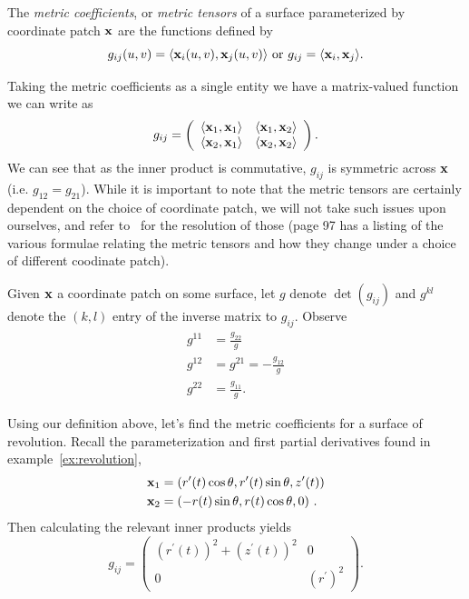   \begin{defn}
    The \emph{metric coefficients}, or \emph{metric tensors} of a surface parameterized by coordinate patch $\mathbf{x}$ are the functions defined by
    \[
      g_{ij}(u, v) = \langle\mathbf{x}_i(u, v), \mathbf{x}_j(u, v)\rangle \text{ or } g_{ij} = \langle\mathbf{x}_i, \mathbf{x}_j\rangle.
    \]

    Taking the metric coefficients as a single entity we have a matrix-valued function we can write as
    \[
      g_{ij} = \left(\begin{array}{cc}
        \langle\mathbf{x}_1, \mathbf{x}_1\rangle & \langle\mathbf{x}_1, \mathbf{x}_2\rangle\\
        \langle\mathbf{x}_2, \mathbf{x}_1\rangle & \langle\mathbf{x}_2, \mathbf{x}_2\rangle
      \end{array}\right).
    \]
    We can see that as the inner product is commutative, $g_{ij}$ is symmetric across $\mathbf{x}$ (i.e. $g_{12} = g_{21}$). While it is important to note that the metric tensors are certainly dependent on the choice of coordinate patch, we will not take such issues upon ourselves, and refer to~\cite{MP77} for the resolution of those (page 97 has a listing of the various formulae relating the metric tensors and how they change under a choice of different coodinate patch).
  \end{defn}
  \begin{lem}
    \label{lem:gkl}
    Given $\mathbf{x}$ a coordinate patch on some surface, let $g$ denote $\det(g_{ij})$ and $g^{kl}$ denote the $(k, l)$ entry of the inverse matrix to $g_{ij}$. Observe
    \begin{align*}
      g^{11} &= \frac{g_{22}}{g}\\
      g^{12} &= g^{21} = -\frac{g_{12}}{g}\\
      g^{22} &= \frac{g_{11}}{g}.
    \end{align*}
  \end{lem}

  \begin{ex}
    Using our definition above, let's find the metric coefficients for a surface of revolution. Recall the parameterization and first partial derivatives found in example~\ref{ex:revolution},
    \begin{align*}
      \mathbf{x}_1 &= (r^\prime(t)\cos{\theta}, r^\prime(t)\sin{\theta}, z^\prime(t))\\
      \mathbf{x}_2 &= (-r(t)\sin{\theta}, r(t)\cos{\theta}, 0) \ .
    \end{align*}
    Then calculating the relevant inner products yields
    \[
      g_{ij} = \left(\begin{array}{cc}
        \left(r^\prime(t)\right)^2 + \left(z^\prime(t)\right)^2 & 0\\
        0 & \left(r^\prime\right)^2
      \end{array}\right).
    \]
  \end{ex}

